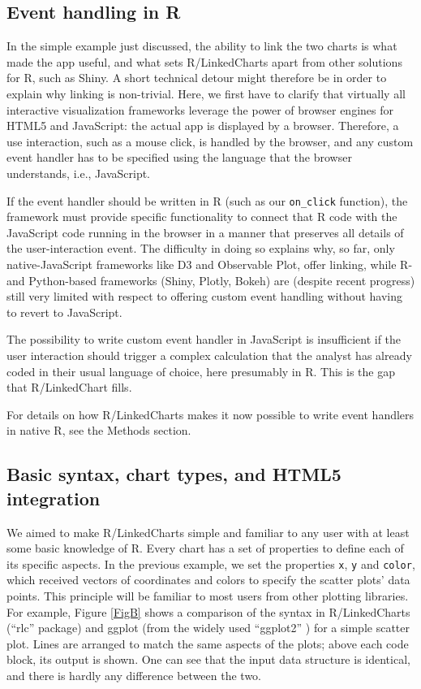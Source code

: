 \documentclass[twocolumn,10pt]{article}
\begin{document}
\subsection{Event handling in R}

In the simple example just discussed, the ability to link the two charts is what made the app useful, and what sets R/LinkedCharts apart from other solutions for R, such as Shiny. A short technical detour might therefore be in order to explain why linking is non-trivial. Here, we first have to clarify that virtually all interactive visualization frameworks leverage the power of browser engines for HTML5 and JavaScript: the actual app is displayed by a browser. Therefore, a use interaction, such as a mouse click, is handled by the browser, and any custom event handler has to be specified using the language that the browser understands, i.e., JavaScript. 

If the event handler should be written in R (such as our \texttt{on_click} function), the framework must provide specific functionality to connect that R code with the JavaScript code running in the browser in a manner that preserves all details of the user-interaction event. The difficulty in doing so explains why, so far, only native-JavaScript frameworks like D3 and Observable Plot, offer linking, while R- and Python-based frameworks (Shiny, Plotly, Bokeh) are (despite recent progress) still very limited with respect to offering custom event handling without having to revert to JavaScript.

The possibility to write custom event handler in JavaScript is insufficient if the user interaction should trigger a complex calculation that the analyst has already coded in their usual language of choice, here presumably in R. This is the gap that R/LinkedChart fills.

For details on how R/LinkedCharts makes it now possible to write event handlers in native R, see the Methods section.

\subsection{Basic syntax, chart types, and HTML5 integration}

We aimed to make R/LinkedCharts simple and familiar to any user with at least some basic knowledge of R. Every chart has a set of properties to define each of its specific aspects. In the previous example, we set the properties \texttt{x}, \texttt{y} and \texttt{color}, which received vectors of coordinates and colors to specify the scatter plots' data points. This principle will be familiar to most users from other plotting libraries. For example, Figure \ref{FigB} shows a comparison of the syntax in R/LinkedCharts (``rlc'' package) and ggplot (from the widely used ``ggplot2'' \citet{wickham_2016}) for a simple scatter plot. Lines are arranged to match the same aspects of the plots; above each code block, its output is shown. One can see that the input data structure is identical, and there is hardly any difference between the two.
\end{document}
